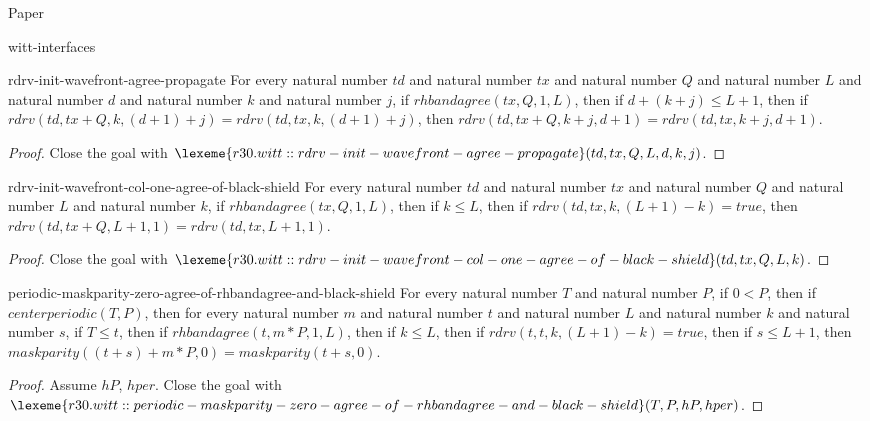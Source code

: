 \begin{lexlean}{Paper}
\begin{section}{witt-interfaces}
  \begin{theorem}{rdrv-init-wavefront-agree-propagate}
  For every natural number \(td\) and natural number \(tx\) and natural number \(Q\) and natural number \(L\) and natural number \(d\) and natural number \(k\) and natural number \(j\), if \(rhbandagree(tx, Q, 1, L)\), then if \(d + (k + j) ≤ L + 1\), then if \(rdrv(td, tx + Q, k, (d + 1) + j) = rdrv(td, tx, k, (d + 1) + j)\), then \(rdrv(td, tx + Q, k + j, d + 1) = rdrv(td, tx, k + j, d + 1)\).
  \begin{proof}
  Close the goal with \(\lexeme{r30.witt::rdrv-init-wavefront-agree-propagate}(td, tx, Q, L, d, k, j)\).
  \end{proof}
  \end{theorem}

  \begin{theorem}{rdrv-init-wavefront-col-one-agree-of-black-shield}
  For every natural number \(td\) and natural number \(tx\) and natural number \(Q\) and natural number \(L\) and natural number \(k\), if \(rhbandagree(tx, Q, 1, L)\), then if \(k ≤ L\), then if \(rdrv(td, tx, k, (L + 1) - k) = true\), then \(rdrv(td, tx + Q, L + 1, 1) = rdrv(td, tx, L + 1, 1)\).
  \begin{proof}
  Close the goal with \(\lexeme{r30.witt::rdrv-init-wavefront-col-one-agree-of-black-shield}(td, tx, Q, L, k)\).
  \end{proof}
  \end{theorem}

  \begin{theorem}{periodic-maskparity-zero-agree-of-rhbandagree-and-black-shield}
  For every natural number \(T\) and natural number \(P\), if \(0 < P\), then if \(centerperiodic(T, P)\), then for every natural number \(m\) and natural number \(t\) and natural number \(L\) and natural number \(k\) and natural number \(s\), if \(T ≤ t\), then if \(rhbandagree(t, m * P, 1, L)\), then if \(k ≤ L\), then if \(rdrv(t, t, k, (L + 1) - k) = true\), then if \(s ≤ L + 1\), then \(maskparity((t + s) + m * P, 0) = maskparity(t + s, 0)\).
  \begin{proof}
  Assume \(hP\), \(hper\).
  Close the goal with \(\lexeme{r30.witt::periodic-maskparity-zero-agree-of-rhbandagree-and-black-shield}(T, P, hP, hper)\).
  \end{proof}
  \end{theorem}


\end{section}
\end{lexlean}
